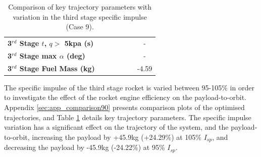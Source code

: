 \begin{table}[ht]
\begin{tabular}{l c c c c c c}
		\textbf{3$^{rd}$ Stage $t$, $q >$ 5kpa (s)}
		& \thirdqOverFiveTThreeNinetyNoReturn
		& \thirdqOverFiveTThreeNinetyFiveNoReturn
		& \thirdqOverFiveTThreeStandardNoReturn
		& \thirdqOverFiveTThreeOneHundredFiveNoReturn
		& \thirdqOverFiveTThreeOneHundredTenNoReturn
		& -
		\\
		\textbf{3$^{rd}$ Stage max $\alpha$ (deg)}
		& \thirdmaxAoATThreeNinetyNoReturn
		& \thirdmaxAoATThreeNinetyFiveNoReturn
		& \thirdmaxAoATThreeStandardNoReturn
		& \thirdmaxAoATThreeOneHundredFiveNoReturn
		& \thirdmaxAoATThreeOneHundredTenNoReturn
		& -
		\\
		\textbf{3$^{rd}$ Stage Fuel Mass (kg)}
		& \thirdmFuelTThreeNinetyNoReturn
		& \thirdmFuelTThreeNinetyFiveNoReturn
		& \thirdmFuelTThreeStandardNoReturn
		& \thirdmFuelTThreeOneHundredFiveNoReturn
		& \thirdmFuelTThreeOneHundredTenNoReturn
		&-4.59
		\\
		\hline 
	\end{tabular} 
	\caption{Comparison of key trajectory parameters with variation in the third stage specific impulse (Case 9).}
	\label{tab:comparison90}
\end{table}

The specific impulse of the third stage rocket is varied between 95-105\% in order to investigate the effect of the rocket engine efficiency on the payload-to-orbit. Appendix \ref{sec:app_comparison90} presents comparison plots of the optimised trajectories, and Table \ref{tab:comparison90} details key trajectory parameters. 
The specific impulse variation has a significant effect on the trajectory of the system, and the payload-to-orbit, increasing the payload by +45.9kg (+24.29\%) at 105\% $I_{sp}$, and decreasing the payload by -45.9kg (-24.22\%) at 95\% $I_{sp}$. 

